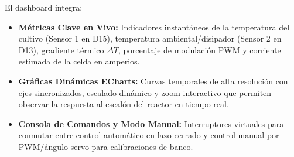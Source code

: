 El dashboard integra:
\begin{itemize}
    \item \textbf{Métricas Clave en Vivo:} Indicadores instantáneos de la temperatura del cultivo (Sensor 1 en D15), temperatura ambiental/disipador (Sensor 2 en D13), gradiente térmico $\Delta T$, porcentaje de modulación PWM y corriente estimada de la celda en amperios.
    \item \textbf{Gráficas Dinámicas ECharts:} Curvas temporales de alta resolución con ejes sincronizados, escalado dinámico y zoom interactivo que permiten observar la respuesta al escalón del reactor en tiempo real.
    \item \textbf{Consola de Comandos y Modo Manual:} Interruptores virtuales para conmutar entre control automático en lazo cerrado y control manual por PWM/ángulo servo para calibraciones de banco.
\end{itemize}
